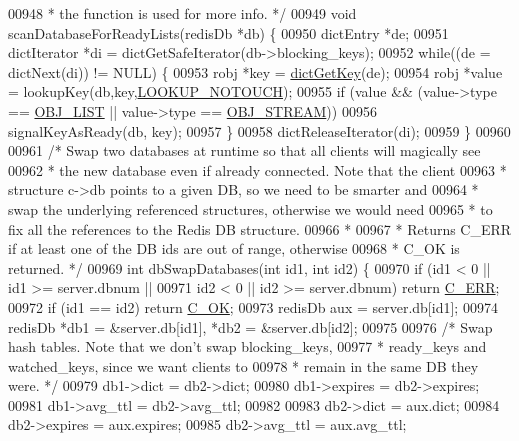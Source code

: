\begin{DoxyCode}
00948 \textcolor{comment}{ * the function is used for more info. */}
00949 \textcolor{keywordtype}{void} scanDatabaseForReadyLists(redisDb *db) \{
00950     dictEntry *de;
00951     dictIterator *di = dictGetSafeIterator(db->blocking\_keys);
00952     \textcolor{keywordflow}{while}((de = dictNext(di)) != NULL) \{
00953         robj *key = \hyperlink{dict_8h_a3271c334309904a3086deca94f96e46e}{dictGetKey}(de);
00954         robj *value = lookupKey(db,key,\hyperlink{server_8h_aedc57e62fa05a1b438fa4ed16a803718}{LOOKUP\_NOTOUCH});
00955         \textcolor{keywordflow}{if} (value && (value->type == \hyperlink{server_8h_a4a5f22a280949c97a0cb0d4213275126}{OBJ\_LIST} || value->type == 
      \hyperlink{server_8h_a2c2cc41300ca6b9daca7ea8a6d66edc6}{OBJ\_STREAM}))
00956             signalKeyAsReady(db, key);
00957     \}
00958     dictReleaseIterator(di);
00959 \}
00960 
00961 \textcolor{comment}{/* Swap two databases at runtime so that all clients will magically see}
00962 \textcolor{comment}{ * the new database even if already connected. Note that the client}
00963 \textcolor{comment}{ * structure c->db points to a given DB, so we need to be smarter and}
00964 \textcolor{comment}{ * swap the underlying referenced structures, otherwise we would need}
00965 \textcolor{comment}{ * to fix all the references to the Redis DB structure.}
00966 \textcolor{comment}{ *}
00967 \textcolor{comment}{ * Returns C\_ERR if at least one of the DB ids are out of range, otherwise}
00968 \textcolor{comment}{ * C\_OK is returned. */}
00969 \textcolor{keywordtype}{int} dbSwapDatabases(\textcolor{keywordtype}{int} id1, \textcolor{keywordtype}{int} id2) \{
00970     \textcolor{keywordflow}{if} (id1 < 0 || id1 >= server.dbnum ||
00971         id2 < 0 || id2 >= server.dbnum) \textcolor{keywordflow}{return} \hyperlink{server_8h_af98ac28d5f4d23d7ed5985188e6fb7d1}{C\_ERR};
00972     \textcolor{keywordflow}{if} (id1 == id2) \textcolor{keywordflow}{return} \hyperlink{server_8h_a303769ef1065076e68731584e758d3e1}{C\_OK};
00973     redisDb aux = server.db[id1];
00974     redisDb *db1 = &server.db[id1], *db2 = &server.db[id2];
00975 
00976     \textcolor{comment}{/* Swap hash tables. Note that we don't swap blocking\_keys,}
00977 \textcolor{comment}{     * ready\_keys and watched\_keys, since we want clients to}
00978 \textcolor{comment}{     * remain in the same DB they were. */}
00979     db1->dict = db2->dict;
00980     db1->expires = db2->expires;
00981     db1->avg\_ttl = db2->avg\_ttl;
00982 
00983     db2->dict = aux.dict;
00984     db2->expires = aux.expires;
00985     db2->avg\_ttl = aux.avg\_ttl;

\end{DoxyCode}
